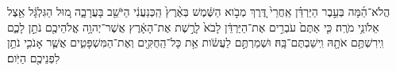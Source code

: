 \documentclass{openreader}
\begin{document}
הֲלֹא־הֵ֜מָּה בְּעֵ֣בֶר הַיַּרְדֵּ֗ן אַֽחֲרֵי֙ דֶּ֚רֶךְ מְבֹ֣וא הַשֶּׁ֔מֶשׁ בְּאֶ֨רֶץ֙ הַֽכְּנַעֲנִ֔י הַיֹּשֵׁ֖ב בָּעֲרָבָ֑ה מ֚וּל הַגִּלְגָּ֔ל אֵ֖צֶל אֵלֹונֵ֥י מֹרֶֽה׃ 
כִּ֤י אַתֶּם֙ עֹבְרִ֣ים אֶת־הַיַּרְדֵּ֔ן לָבֹא֙ לָרֶ֣שֶׁת אֶת־הָאָ֔רֶץ אֲשֶׁר־יְהוָ֥ה אֱלֹהֵיכֶ֖ם נֹתֵ֣ן לָכֶ֑ם וִֽירִשְׁתֶּ֥ם אֹתָ֖הּ וִֽישַׁבְתֶּם־בָּֽהּ׃ 
וּשְׁמַרְתֶּ֣ם לַעֲשֹׂ֔ות אֵ֥ת כָּל־הַֽחֻקִּ֖ים וְאֶת־הַמִּשְׁפָּטִ֑ים אֲשֶׁ֧ר אָנֹכִ֛י נֹתֵ֥ן לִפְנֵיכֶ֖ם הַיֹּֽום׃ 
\end{document}
